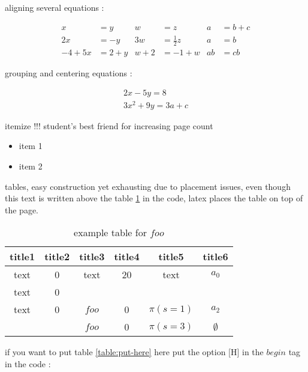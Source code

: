 \documentclass[12pt]{article}
\begin{document}
aligning several equations :

\begin{align*}
x&=y           &  w &=z              &  a&=b+c\\
2x&=-y         &  3w&=\frac{1}{2}z   &  a&=b\\
-4 + 5x&=2+y   &  w+2&=-1+w          &  ab&=cb
\end{align*}

grouping and centering equations :

\begin{gather*} 
2x - 5y =  8 \\ 
3x^2 + 9y =  3a + c
\end{gather*}

\vspace*{30px}

itemize !!! student's best friend for increasing page count

\begin{itemize}
\item item 1
\item item 2 

\end{itemize}


tables, easy construction yet exhausting due to placement issues, even though this text 
is written above the table \ref{table:example} in the code, latex places the table 
on top of the page.

\begin{table}
\small
\centering
\caption{ example table for $foo$ }
\label{table:example}
\begin{tabular}{|c|c|c|c|c|c|}	%
\hline 							%
\textbf{title1} & \textbf{title2} & \textbf{title3} & \textbf{title4} & \textbf{title5} & \textbf{title6} \\
\hline 
\hline 
text & 0 & text & 20 & text & $a_0$\\			%
text & 0 & & & & \\
text & 0 & $foo$ & 0 & $\pi(s = 1)$ & $a_2$\\
 &  & $foo$ & 0 & $\pi(s = 3)$ & $\emptyset$\\


\hline 
\end{tabular}
\end{table}


if you want to put table \ref{table:put-here} here put the option [H] in the $begin$ tag in the code :
\end{document}

